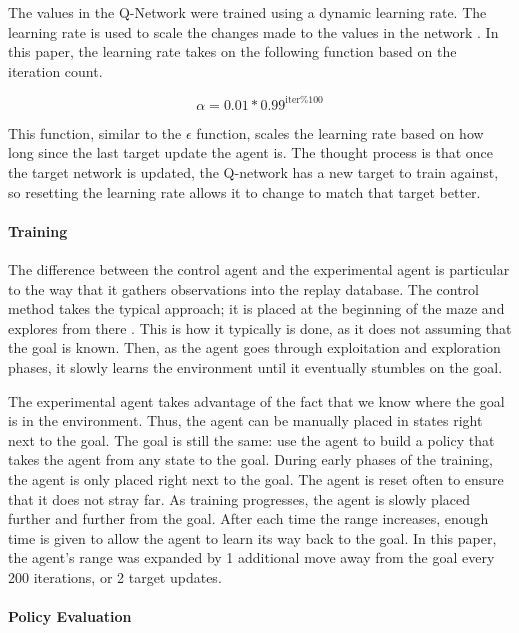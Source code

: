 \documentclass[12pt,letterpaper]{article}
\begin{document}
The values in the Q-Network were trained using a dynamic learning rate.
The learning rate is used to scale the changes made to the values in the network \cite{article_reinforcement_learning_for_robots}.
In this paper, the learning rate takes on the following function based on the iteration count.

$$\alpha = 0.01 * 0.99^{\text{iter} \% 100}$$

This function, similar to the $\epsilon$ function, scales the learning rate based on how long since the last target update the agent is.
The thought process is that once the target network is updated, the Q-network has a new target to train against, so resetting the learning rate allows it to change to match that target better.

\paragraph{Training} 

The difference between the control agent and the experimental agent is particular to the way that it gathers observations into the replay database.
The control method takes the typical approach; it is placed at the beginning of the maze and explores from there \cite{article_reinforcement_learning_survey}.
This is how it typically is done, as it does not assuming that the goal is known.
Then, as the agent goes through exploitation and exploration phases, it slowly learns the environment until it eventually stumbles on the goal.

The experimental agent takes advantage of the fact that we know where the goal is in the environment.
Thus, the agent can be manually placed in states right next to the goal.
The goal is still the same: use the agent to build a policy that takes the agent from any state to the goal.
During early phases of the training, the agent is only placed right next to the goal.
The agent is reset often to ensure that it does not stray far.
As training progresses, the agent is slowly placed further and further from the goal.
After each time the range increases, enough time is given to allow the agent to learn its way back to the goal.
In this paper, the agent's range was expanded by 1 additional move away from the goal every 200 iterations, or 2 target updates.

\paragraph{Policy Evaluation}
\end{document}

